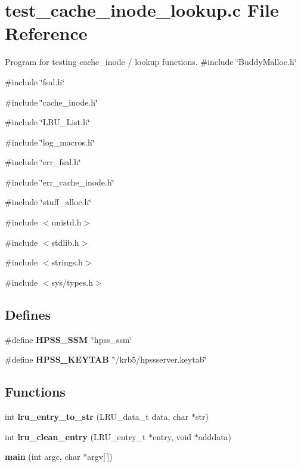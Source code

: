 \section{test\_\-cache\_\-inode\_\-lookup.c File Reference}
\label{test__cache__inode__lookup_8c}


Program for testing cache\_\-inode / lookup functions.  
{\ttfamily \#include \char`\"{}BuddyMalloc.h\char`\"{}}\par
{\ttfamily \#include \char`\"{}fsal.h\char`\"{}}\par
{\ttfamily \#include \char`\"{}cache\_\-inode.h\char`\"{}}\par
{\ttfamily \#include \char`\"{}LRU\_\-List.h\char`\"{}}\par
{\ttfamily \#include \char`\"{}log\_\-macros.h\char`\"{}}\par
{\ttfamily \#include \char`\"{}err\_\-fsal.h\char`\"{}}\par
{\ttfamily \#include \char`\"{}err\_\-cache\_\-inode.h\char`\"{}}\par
{\ttfamily \#include \char`\"{}stuff\_\-alloc.h\char`\"{}}\par
{\ttfamily \#include $<$unistd.h$>$}\par
{\ttfamily \#include $<$stdlib.h$>$}\par
{\ttfamily \#include $<$strings.h$>$}\par
{\ttfamily \#include $<$sys/types.h$>$}\par
\subsection*{Defines}
\begin{DoxyCompactItemize}
\item 
\#define {\bf HPSS\_\-SSM}~\char`\"{}hpss\_\-ssm\char`\"{}
\item 
\#define {\bf HPSS\_\-KEYTAB}~\char`\"{}/krb5/hpssserver.keytab\char`\"{}
\end{DoxyCompactItemize}
\subsection*{Functions}
\begin{DoxyCompactItemize}
\item 
int {\bf lru\_\-entry\_\-to\_\-str} (LRU\_\-data\_\-t data, char $\ast$str)
\item 
int {\bf lru\_\-clean\_\-entry} (LRU\_\-entry\_\-t $\ast$entry, void $\ast$adddata)
\item 
{\bf main} (int argc, char $\ast$argv[$\,$])
\end{DoxyCompactItemize}


